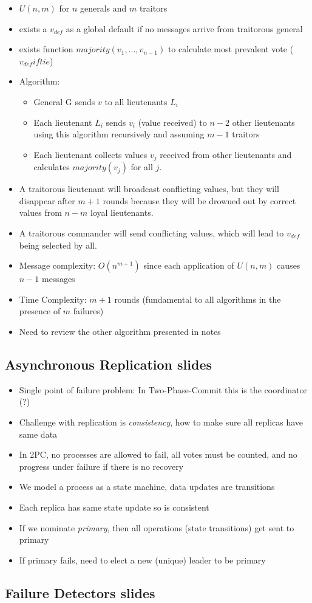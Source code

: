 \documentclass[a4paper,10pt,]{article}
\begin{document}
\begin{itemize}
  \item $U(n,m)$ for $n$ generals and $m$ traitors
  \item exists a $v_{def}$ as a global default if no messages arrive from traitorous general
  \item exists function $majority(v_1, \ldots, v_{n-1})$ to calculate most prevalent vote ($v_{def} if tie$)
  \item Algorithm:
  \begin{itemize}
    \item General G sends $v$ to all lieutenants $L_i$
    \item Each lieutenant $L_i$ sends $v_i$ (value received) to $n-2$ other lieutenants using this algorithm recursively and assuming $m-1$ traitors
    \item Each lieutenant collects values $v_j$ received from other lieutenants and calculates $majority(v_j)$ for all $j$.
  \end{itemize}
  \item A traitorous lieutenant will broadcast conflicting values, but they will disappear after $m+1$ rounds because they will be drowned out by correct values from $n-m$ loyal lieutenants.
  \item A traitorous commander will send conflicting values, which will lead to $v_{def}$ being selected by all.
  \item Message complexity: $O(n^{m+1})$ since each application of $U(n,m)$ causes $n-1$ messages
  \item  Time Complexity: $m+1$ rounds (fundamental to all algorithms in the presence of $m$ failures)
  \item Need to review the other algorithm presented in notes
\end{itemize}

\subsection{Asynchronous Replication slides}
\begin{itemize}
  \item Single point of failure problem: In Two-Phase-Commit this is the coordinator (?)
  \item Challenge with replication is \emph{consistency}, how to make sure all replicas have same data
  \item In 2PC, no processes are allowed to fail, all votes must be counted, and no progress under failure if there is no recovery
  \item We model a process as a state machine, data updates are transitions
  \item Each replica has same state update so is consistent
  \item If we nominate \emph{primary}, then all operations (state transitions) get sent to primary
  \item If primary fails, need to elect a new (unique) leader to be primary
\end{itemize}


\subsection{Failure Detectors slides}
\end{document}
